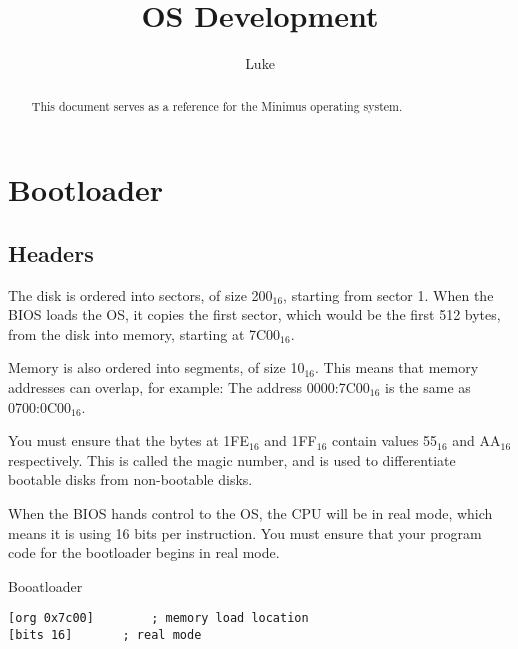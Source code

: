 \documentclass{article}
\title{OS Development}
\author{Luke}
\begin{document}
\maketitle

\begin{abstract}

This document serves as a reference for the Minimus operating system.

\end{abstract}

\newpage

\tableofcontents

\newpage

\section{Bootloader}

\subsection{Headers}

The disk is ordered into sectors, of size 200$_{16}$, starting from sector 1.
When the BIOS loads the OS, it copies the first sector,
which would be the first 512 bytes, from the disk into memory,
starting at 7C00$_{16}$.

Memory is also ordered into segments, of size 10$_{16}$. This means that memory
addresses can overlap, for example:
The address 0000:7C00$_{16}$ is the same as 0700:0C00$_{16}$.

You must ensure that the bytes at 1FE$_{16}$ and 1FF$_{16}$
contain values 55$_{16}$ and AA$_{16}$ respectively.
This is called the magic number, and is used to differentiate
bootable disks from non-bootable disks.

When the BIOS hands control to the OS, the CPU will be in real mode,
which means it is using 16 bits per instruction. You must
ensure that your program code for the bootloader begins in real mode.

\begin{listing}[h]
\caption{Booatloader}
\begin{verbatim}
[org 0x7c00]		; memory load location
[bits 16]		; real mode
\end{verbatim}
\end{listing}

\newpage

\begin{thebibliography}{99}
\end{thebibliography}
\end{document}
